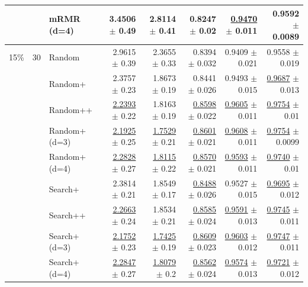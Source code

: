\begin{longtable}{llp{}rrrrr}
 &  & mRMR (d=4) & 3.4506 {\scriptsize $\pm$ 0.49} & 2.8114 {\scriptsize $\pm$ 0.41} & 0.8247 {\scriptsize $\pm$ 0.02} & \underline{0.9470} {\scriptsize $\pm$ 0.011} & 0.9592 {\scriptsize $\pm$ 0.0089} \\
\midrule
15\% & 30 & Random & 2.9615 {\scriptsize $\pm$ 0.39} & 2.3655 {\scriptsize $\pm$ 0.33} & 0.8394 {\scriptsize $\pm$ 0.032} & 0.9409 {\scriptsize $\pm$ 0.021} & 0.9558 {\scriptsize $\pm$ 0.019} \\
 &  & Random+ & 2.3757 {\scriptsize $\pm$ 0.23} & 1.8673 {\scriptsize $\pm$ 0.19} & 0.8441 {\scriptsize $\pm$ 0.026} & 0.9493 {\scriptsize $\pm$ 0.015} & \underline{0.9687} {\scriptsize $\pm$ 0.013} \\
 &  & Random++ & \underline{2.2393} {\scriptsize $\pm$ 0.22} & 1.8163 {\scriptsize $\pm$ 0.19} & \underline{0.8598} {\scriptsize $\pm$ 0.022} & \underline{0.9605} {\scriptsize $\pm$ 0.011} & \underline{0.9754} {\scriptsize $\pm$ 0.01} \\
 &  & Random+ (d=3) & \underline{2.1925} {\scriptsize $\pm$ 0.25} & \underline{1.7529} {\scriptsize $\pm$ 0.21} & \underline{0.8601} {\scriptsize $\pm$ 0.021} & \underline{0.9608} {\scriptsize $\pm$ 0.011} & \underline{0.9754} {\scriptsize $\pm$ 0.0099} \\
 &  & Random+ (d=4) & \underline{2.2828} {\scriptsize $\pm$ 0.27} & \underline{1.8115} {\scriptsize $\pm$ 0.22} & \underline{0.8570} {\scriptsize $\pm$ 0.021} & \underline{0.9593} {\scriptsize $\pm$ 0.011} & \underline{0.9740} {\scriptsize $\pm$ 0.01} \\
 &  & Search+ & 2.3814 {\scriptsize $\pm$ 0.21} & 1.8549 {\scriptsize $\pm$ 0.17} & \underline{0.8488} {\scriptsize $\pm$ 0.026} & 0.9527 {\scriptsize $\pm$ 0.015} & \underline{0.9695} {\scriptsize $\pm$ 0.012} \\
 &  & Search++ & \underline{2.2663} {\scriptsize $\pm$ 0.24} & 1.8534 {\scriptsize $\pm$ 0.21} & \underline{0.8585} {\scriptsize $\pm$ 0.024} & \underline{0.9591} {\scriptsize $\pm$ 0.013} & \underline{0.9745} {\scriptsize $\pm$ 0.011} \\
 &  & Search+ (d=3) & \underline{2.1752} {\scriptsize $\pm$ 0.23} & \underline{1.7425} {\scriptsize $\pm$ 0.19} & \underline{0.8609} {\scriptsize $\pm$ 0.023} & \underline{0.9603} {\scriptsize $\pm$ 0.012} & \underline{0.9747} {\scriptsize $\pm$ 0.011} \\
 &  & Search+ (d=4) & \underline{2.2847} {\scriptsize $\pm$ 0.27} & \underline{1.8079} {\scriptsize $\pm$ 0.2} & \underline{0.8562} {\scriptsize $\pm$ 0.024} & \underline{0.9574} {\scriptsize $\pm$ 0.013} & \underline{0.9721} {\scriptsize $\pm$ 0.012} \\

\end{longtable}
